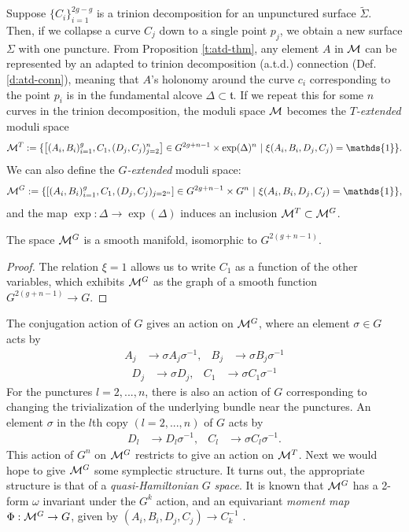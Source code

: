 	Suppose $\{C_i\}_{i=1}^{2g-g}$ is a trinion decomposition for an unpunctured surface $\tilde{\Sigma}$. Then, if we collapse a curve $C_j$ down to a single point $p_j$, we obtain a new surface $\Sigma$ with one puncture. From Proposition \ref{t:atd-thm}, any element $A$ in $\mathcal{M}$ can be represented by an adapted to trinion decomposition (a.t.d.) connection (Def. \ref{d:atd-conn}), meaning that $A$'s holonomy around the curve $c_i$ corresponding to the point $p_i$ is in the fundamental alcove $\Delta\subset \mathfrak{t}$. If we repeat this for some $n$ curves in the trinion decomposition, the moduli space $\mathcal{M}$ becomes the \emph{$T$-extended} moduli space
	\begin{equation}
		\MM^T := \{\left[(A_i,B_i)_{i=1}^{g},C_1,(D_j,C_j)_{j=2}^n\right]\in G^{2g+n-1}\times \exp(\Delta)^n ~|~ \xi(A_i,B_i,D_j,C_j) = \mathds{1}\}.
	\end{equation}
	We can also define the \emph{$G$-extended} moduli space:
	\begin{equation}
	\MM^G := \{\left[(A_i,B_i)_{i=1}^{g},C_1,(D_j,C_j)_{j=2^n}\right]\in G^{2g+n-1}\times G^n ~|~ \xi(A_i,B_i,D_j,C_j) = \mathds{1}\},
	\end{equation}
	and the map $\exp:\Delta\to\exp(\Delta)$ induces an inclusion $\mathcal{M}^T \subset \mathcal{M}^G$.
	\begin{theorem}
		The space $\mathcal{M}^G$ is a smooth manifold, isomorphic to $G^{2(g+n-1)}$.
	\end{theorem}
	\begin{proof}
		The relation $\xi = 1$ allows us to write $C_1$ as a function of the other variables, which exhibits $\mathcal{M}^G$ as the graph of a smooth function $G^{2(g+n-1)}\to G$.
	\end{proof}
	
	The conjugation action of $G$ gives an action on $\mathcal{M}^G$, where an element $\sigma \in G$ acts by
	\begin{align*}
		A_j &\to \sigma A_j \sigma^{-1},& 	B_j&\to \sigma B_j\sigma^{-1}
	\end{align*}
	\begin{align*}
		D_j&\to \sigma D_j, & C_1 &\to \sigma C_1\sigma^{-1}
	\end{align*}
	For the punctures $l=2,...,n$, there is also an action of $G$ corresponding to changing the trivialization of the underlying bundle near the punctures. An element $\sigma$ in the $l$th copy $(l=2,...,n)$ of $G$ acts by
	\begin{align}
	\label{e:impl-action}
	D_l&\to D_l\sigma^{-1}, & C_l &\to \sigma C_l\sigma^{-1}.
	\end{align}
	This action of $G^n$ on $\mathcal{M}^G$ restricts to give an action on $\mathcal{M}^T$. Next we would hope to give $\mathcal{M}^G$ some symplectic structure. It turns out, the appropriate structure is that of a \textit{quasi-Hamiltonian} $G$ \textit{space}. It is known that $\mathcal{M}^G$ has a 2-form $\omega$ invariant under the $G^k$ action, and an equivariant \textit{moment map} $\Phi:\mathcal{M}^G\to G$, given by $(A_i,B_i,D_j,C_j)\to C_k^{-1}$ \cite{alekseev_lie_1998}. 
	
